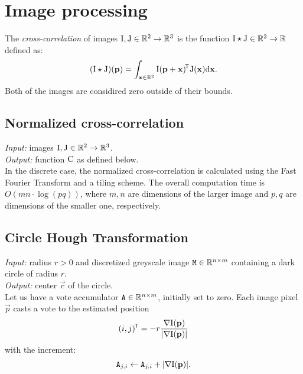 \section{Image processing}

\begin{definition}
The \textit{cross-correlation} of images $\mathrm{I}, \mathrm{J} \in \mathbb{R}^2 \to \mathbb{R}^3$ is the function $\mathrm{I} \star \mathrm{J} \in \mathbb{R}^2 \to \mathbb{R}$ defined as:
$$
(\mathrm{I} \star \mathrm{J})(\mathbf{p}) = \int_{\mathbf{x} \in \mathbb{R}^2} \mathrm{I}(\mathbf{p} + \mathbf{x})^{\!\mathsf{T}} \mathrm{J}(\mathbf{x}) \mathrm{d} \mathbf{x}.
$$
Both of the images are considired zero outside of their bounds.
\end{definition}

\subsection{Normalized cross-correlation}

\textit{Input:} images $\mathrm{I}, \mathrm{J} \in \mathbb{R}^2 \to \mathbb{R}^3$.\\
\textit{Output:} function $\mathrm{C}$ as defined below.\\


In the discrete case, the normalized cross-correlation is calculated using the Fast Fourier Transform and a tiling scheme.
The overall computation time is $O(mn \cdot \log(pq))$, where $m, n$ are dimensions of the larger image and $p, q$ are dimensions of the smaller one, respectively.

\subsection{Circle Hough Transformation}
\label{s:algo-hough}

\textit{Input:} radius $r > 0$ and discretized greyscale image $\mathtt{M} \in \mathbb{R}^{n \times m}$ containing a dark circle of radius $r$.\\
\textit{Output:} center $\vec c$ of the circle.\\

Let us have a vote accumulator $\mathtt{A} \in \mathbb{R}^{n \times m}$, initially set to zero.
Each image pixel $\vec p$ casts a vote to the estimated position
\begin{equation}
(i, j)^{\!\mathsf{T}} = -r \frac {\nabla \mathrm{I}(\mathbf{p})} {|\nabla \mathrm{I}(\mathbf{p})|}
\end{equation}
with the increment:
\begin{equation}
\mathtt{A}_{j, i} \leftarrow \mathtt{A}_{j, i} + |\nabla \mathrm{I}(\mathbf{p})|.
\end{equation}

